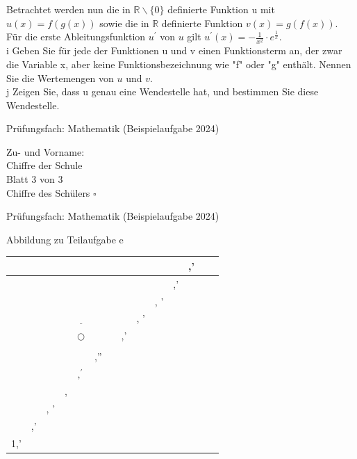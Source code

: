 \documentclass[10pt]{article}
\begin{document}
Betrachtet werden nun die in $\mathbb{R} \backslash\{0\}$ definierte Funktion u mit $u(x)=f(g(x))$ sowie die in $\mathbb{R}$ definierte Funktion $v(x)=g(f(x))$. Für die erste Ableitungsfunktion $u^{\prime}$ von $u$ gilt $u^{\prime}(x)=-\frac{1}{x^{2}} \cdot e^{\frac{1}{x}}$.\\
i Geben Sie für jede der Funktionen u und v einen Funktionsterm an, der zwar die Variable x, aber keine Funktionsbezeichnung wie "f" oder "g" enthält. Nennen Sie die Wertemengen von $u$ und $v$.\\
j Zeigen Sie, dass u genau eine Wendestelle hat, und bestimmen Sie diese Wendestelle.

Prüfungsfach: Mathematik (Beispielaufgabe 2024)

Zu- und Vorname: $\qquad$\\
Chiffre der Schule\\
Blatt 3 von 3\\
Chiffre des Schülers $\square$

Prüfungsfach: Mathematik (Beispielaufgabe 2024)

Abbildung zu Teilaufgabe e

\begin{center}
\begin{tabular}{|c|c|c|c|c|c|c|c|c|c|c|c|c|c|}
\hline
 &  &  &  &  &  &  &  &  &  &  & ,' &  &  \\
\hline
 &  &  &  &  &  &  &  &  &  & ,' &  &  &  \\
\hline
 &  &  &  &  &  &  &  &  & , ' &  &  &  &  \\
\hline
 &  &  &  & $\underline{ }$ &  &  &  & , ' &  &  &  &  &  \\
\hline
 &  &  &  & $\bigcirc$ &  &  & ,' &  &  &  &  &  &  \\
\hline
 &  &  &  &  &  &  &  &  &  &  &  &  &  \\
\hline
 &  &  &  &  & ,'' &  &  &  &  &  &  &  &  \\
\hline
 &  &  &  & \( ,^{\prime} \) &  &  &  &  &  &  &  &  &  \\
\hline
 &  &  & , &  &  &  &  &  &  &  &  &  &  \\
\hline
 &  & , ' &  &  &  &  &  &  &  &  &  &  &  \\
\hline
 & ,' &  &  &  &  &  &  &  &  &  &  &  &  \\
\hline
1,' &  &  &  &  &  &  &  &  &  &  &  &  &  \\
\hline
\end{tabular}
\end{center}
\end{document}
